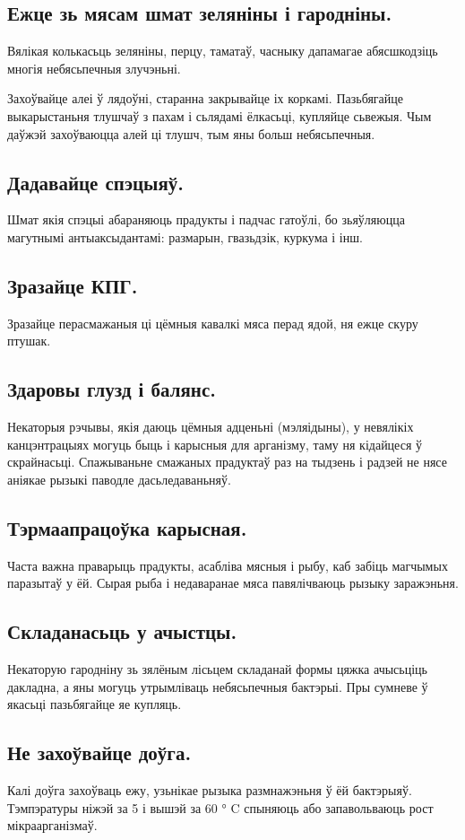 \subsection{Ежце зь мясам шмат зеляніны і гародніны.}
Вялікая колькасьць зеляніны, перцу, таматаў, часныку дапамагае абясшкодзіць многія небясьпечныя злучэньні.

Захоўвайце алеі ў лядоўні, старанна закрывайце іх коркамі. Пазьбягайце выкарыстаньня тлушчаў з пахам і сьлядамі ёлкасьці, купляйце сьвежыя. Чым даўжэй захоўваюцца алей ці тлушч, тым яны больш небясьпечныя.

\subsection{Дадавайце спэцыяў.}
Шмат якія спэцыі абараняюць прадукты і падчас гатоўлі, бо зьяўляюцца магутнымі антыаксыдантамі: размарын, гвазьдзік, куркума і інш.

\subsection{Зразайце КПГ.}
Зразайце перасмажаныя ці цёмныя кавалкі мяса перад ядой, ня ежце скуру птушак.

\subsection{Здаровы глузд і балянс.}
Некаторыя рэчывы, якія даюць цёмныя адценьні (мэляідыны), у невялікіх канцэнтрацыях могуць быць і карысныя для арганізму, таму ня кідайцеся ў скрайнасьці. Спажываньне смажаных прадуктаў раз на тыдзень і радзей не нясе аніякае рызыкі паводле дасьледаваньняў.

\subsection{Тэрмаапрацоўка карысная.}
Часта важна праварыць прадукты, асабліва мясныя і рыбу, каб забіць магчымых паразытаў у ёй. Сырая рыба і недаваранае мяса павялічваюць рызыку заражэньня.

\subsection{Складанасьць у ачыстцы.}
Некаторую гародніну зь зялёным лісьцем складанай формы цяжка ачысьціць дакладна, а яны могуць утрымліваць небясьпечныя бактэрыі. Пры сумневе ў якасьці пазьбягайце яе купляць.

\subsection{Не захоўвайце доўга.}
Калі доўга захоўваць ежу, узьнікае рызыка размнажэньня ў ёй бактэрыяў. Тэмпэратуры ніжэй за 5 і вышэй за 60 ° C спыняюць або запавольваюць рост мікраарганізмаў.

